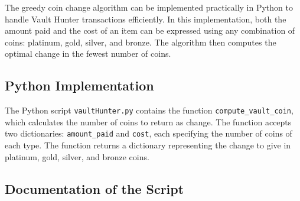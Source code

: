 \documentclass[12pt,a4paper]{report}
\begin{document}
The greedy coin change algorithm can be implemented practically in Python to handle Vault Hunter transactions efficiently. In this implementation, both the amount paid and the cost of an item can be expressed using any combination of coins: platinum, gold, silver, and bronze. The algorithm then computes the optimal change in the fewest number of coins.

\subsection{Python Implementation}

The Python script \texttt{vaultHunter.py} contains the function \texttt{compute\_vault\_coin}, which calculates the number of coins to return as change. The function accepts two dictionaries: \texttt{amount\_paid} and \texttt{cost}, each specifying the number of coins of each type. The function returns a dictionary representing the change to give in platinum, gold, silver, and bronze coins.



\subsection{Documentation of the Script}
\end{document}
